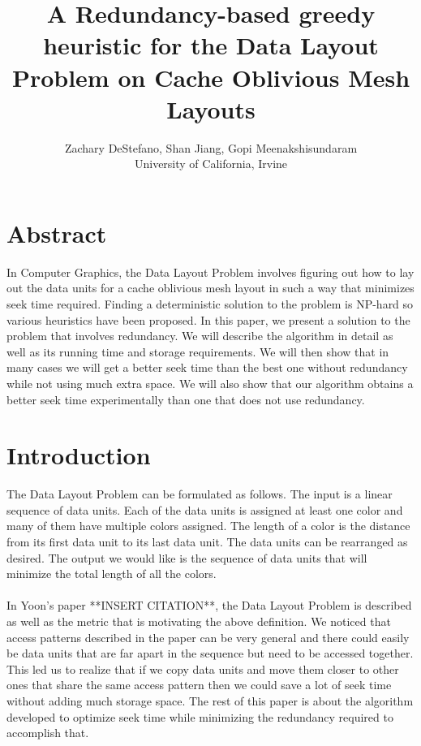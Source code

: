 \documentclass[11pt,psfig]{article}
\begin{document}
\setlength{\parskip}{1.2ex plus0.3ex minus 0.3ex}


\thispagestyle{empty} \pagestyle{myheadings} 



\title{A Redundancy-based greedy heuristic for the Data Layout Problem on Cache Oblivious Mesh Layouts}
\author{Zachary DeStefano, Shan Jiang, Gopi Meenakshisundaram\\ University of California, Irvine}

\maketitle

\vfill\eject

\section*{Abstract}

In Computer Graphics, the Data Layout Problem involves figuring out how to lay out the data units for a cache oblivious mesh layout in such a way that minimizes seek time required. Finding a deterministic solution to the problem is NP-hard so various heuristics have been proposed. In this paper, we present a solution to the problem that involves redundancy. We will describe the algorithm in detail as well as its running time and storage requirements. We will then show that in many cases we will get a better seek time than the best one without redundancy while not using much extra space. We will also show that our algorithm obtains a better seek time experimentally than one that does not use redundancy. 

\section*{Introduction}

The Data Layout Problem can be formulated as follows. The input is a linear sequence of data units. Each of the data units is assigned at least one color and many of them have multiple colors assigned. The length of a color is the distance from its first data unit to its last data unit. The data units can be rearranged as desired. The output we would like is the sequence of data units that will minimize the total length of all the colors. \\
\\
In Yoon's paper **INSERT CITATION**, the Data Layout Problem is described as well as the metric that is motivating the above definition. We noticed that access patterns described in the paper can be very general and there could easily be data units that are far apart in the sequence but need to be accessed together. This led us to realize that if we copy data units and move them closer to other ones that share the same access pattern then we could save a lot of seek time without adding much storage space. The rest of this paper is about the algorithm developed to optimize seek time while minimizing the redundancy required to accomplish that. \\
\\
\end{document}
